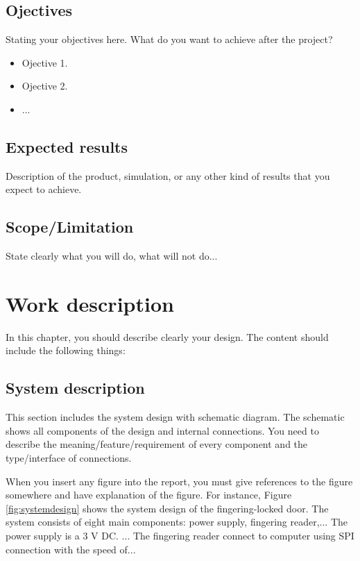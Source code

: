 \documentclass[12pt]{report}
\begin{document}
	\section{Ojectives}
	
	Stating your objectives here. What do you want to achieve after the project?
	\begin{itemize}
		\item Ojective 1.
		\item Ojective 2.
		\item ...
	\end{itemize}
	
	\section{Expected results}
	Description of the product, simulation, or any other kind of results
	that you expect to achieve.
	
	\section{Scope/Limitation}
	State clearly what you will do, what will not do...
	
	\chapter{Work description}
	
	In this chapter, you should describe clearly your design.
	The content should include the following things:
		
	\section{System description}
	This section includes the system design with schematic diagram.
	The schematic shows all components of the design and internal connections.
	You need to describe the meaning/feature/requirement of every component
	and the type/interface of connections.	
	
	When you insert any figure into the report,
	you must give references to the figure somewhere and
	have explanation of the figure.
	For instance,
	Figure \ref{fig:systemdesign} shows the system design of the fingering-locked door.
	The system consists of eight main components: power supply, fingering reader,...
	The power supply is a 3 V DC.
	...
	The fingering reader connect to computer using SPI connection with the speed of...
	
\end{document}
